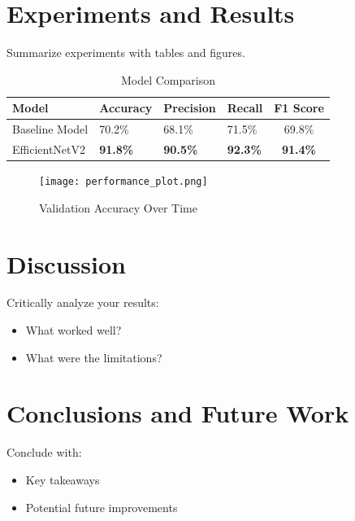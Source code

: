 \documentclass[11pt]{article}
\begin{document}
\section{Experiments and Results}
Summarize experiments with tables and figures.
\begin{table}[H]
    \centering
    \caption{Model Comparison}
    \begin{tabularx}{\linewidth}{lYYYc}
        \toprule
        Model & Accuracy & Precision & Recall & F1 Score \\
        \midrule
        Baseline Model & 70.2\% & 68.1\% & 71.5\% & 69.8\% \\
        EfficientNetV2 & \textbf{91.8\%} & \textbf{90.5\%} & \textbf{92.3\%} & \textbf{91.4\%} \\
        \bottomrule
    \end{tabularx}
\end{table}

\begin{figure}[H]
    \centering
    \texttt{[image: performance\_plot.png]}
    \caption{Validation Accuracy Over Time}
\end{figure}

\section{Discussion}
Critically analyze your results:
\begin{itemize}
    \item What worked well?
    \item What were the limitations?
\end{itemize}

\section{Conclusions and Future Work}
Conclude with:
\begin{itemize}
    \item Key takeaways
    \item Potential future improvements
\end{itemize}



\end{document}
